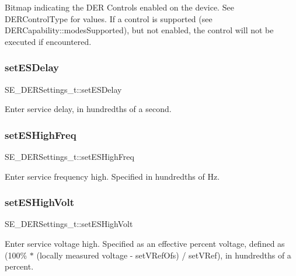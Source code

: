 Bitmap indicating the D\+ER Controls enabled on the device. See D\+E\+R\+Control\+Type for values. If a control is supported (see D\+E\+R\+Capability\+::modes\+Supported), but not enabled, the control will not be executed if encountered. \mbox{\label{group__DERSettings_gad664e0997c68f283b185484d139e6ad6}} 
\subsubsection{\texorpdfstring{set\+E\+S\+Delay}{setESDelay}}
{\footnotesize\ttfamily S\+E\+\_\+\+D\+E\+R\+Settings\+\_\+t\+::set\+E\+S\+Delay}

Enter service delay, in hundredths of a second. \mbox{\label{group__DERSettings_ga7a857f8a4b6489b0d8ae60455b57e5ae}} 
\subsubsection{\texorpdfstring{set\+E\+S\+High\+Freq}{setESHighFreq}}
{\footnotesize\ttfamily S\+E\+\_\+\+D\+E\+R\+Settings\+\_\+t\+::set\+E\+S\+High\+Freq}

Enter service frequency high. Specified in hundredths of Hz. \mbox{\label{group__DERSettings_ga9e1a2f2b9469c0ee78fa18ecd81896ae}} 
\subsubsection{\texorpdfstring{set\+E\+S\+High\+Volt}{setESHighVolt}}
{\footnotesize\ttfamily S\+E\+\_\+\+D\+E\+R\+Settings\+\_\+t\+::set\+E\+S\+High\+Volt}

Enter service voltage high. Specified as an effective percent voltage, defined as (100\% $\ast$ (locally measured voltage -\/ set\+V\+Ref\+Ofs) / set\+V\+Ref), in hundredths of a percent. \mbox{\label{group__DERSettings_ga2fbc27ba03bb7454ea4f831a454b1687}} 

